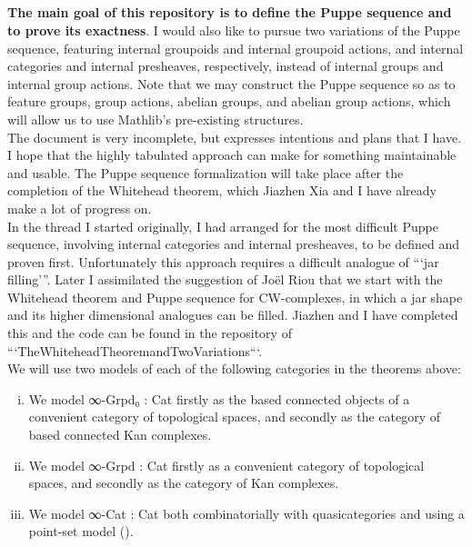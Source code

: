 \documentclass{book}
\theoremstyle{definition}
\newcounter{pcounter}
\newcounter{sectioncount}
\newcounter{subsectioncount}
\renewcommand{\section}[1]{\newpage\ \\ \ \\ \begin{center} \scalebox{1.5}{\texttt{\thesectioncount . #1}} \stepcounter{sectioncount} \setcounter{subsectioncount}{1} \end{center} \begin{center} \ \\ \ \\ \thispagestyle{empty} \end{center}}
\begin{document}
\newpage
\section{Introduction}

{\bf The main goal of this repository is to define the Puppe sequence and to prove its exactness}. I would also like to pursue two variations of the Puppe sequence, featuring internal groupoids and internal groupoid actions, and internal categories and internal presheaves, respectively, instead of internal groups and internal group actions. Note that we may construct the Puppe sequence so as to feature groups, group actions, abelian groups, and abelian group actions, which will allow us to use Mathlib's pre-existing structures.\\

The document is very incomplete, but expresses intentions and plans that I have. I hope that the highly tabulated approach can make for something maintainable and usable. The Puppe sequence formalization will take place after the completion of the Whitehead theorem, which Jiazhen Xia and I have already make a lot of progress on.\\

In the thread I started originally, I had arranged for the most difficult Puppe sequence, involving internal categories and internal presheaves, to be defined and proven first. Unfortunately this approach requires a difficult analogue of ```jar filling'''. Later I assimilated the suggestion of Joël Riou that we start with the Whitehead theorem and Puppe sequence for CW-complexes, in which a jar shape and its higher dimensional analogues can be filled. Jiazhen and I have completed this and the code can be found in the repository of ```TheWhiteheadTheoremandTwoVariations```.\\

We will use two models of each of the following categories in the theorems above:
\begin{enumerate}[(i)]
\item We model ∞-Grpd₀ : Cat firstly as the based connected objects of a convenient category of topological spaces, and secondly as the category of based connected Kan complexes.
\item We model ∞-Grpd : Cat firstly as a convenient category of topological spaces, and secondly as the category of Kan complexes.
\item We model ∞-Cat : Cat both combinatorially with quasicategories and using a point-set model ().
\end{enumerate}
\end{document}
